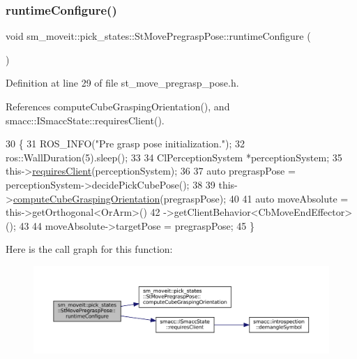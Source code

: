 \subsubsection{\texorpdfstring{runtime\+Configure()}{runtimeConfigure()}}
{\footnotesize\ttfamily void sm\+\_\+moveit\+::pick\+\_\+states\+::\+St\+Move\+Pregrasp\+Pose\+::runtime\+Configure (\begin{DoxyParamCaption}{ }\end{DoxyParamCaption})\hspace{0.3cm}{\ttfamily [inline]}}



Definition at line 29 of file st\+\_\+move\+\_\+pregrasp\+\_\+pose.\+h.



References compute\+Cube\+Grasping\+Orientation(), and smacc\+::\+I\+Smacc\+State\+::requires\+Client().


\begin{DoxyCode}
30     \{
31         ROS\_INFO(\textcolor{stringliteral}{"Pre grasp pose initialization."});
32         ros::WallDuration(5).sleep();
33 
34         ClPerceptionSystem *perceptionSystem;
35         this->\hyperlink{classsmacc_1_1ISmaccState_a7f95c9f0a6ea2d6f18d1aec0519de4ac}{requiresClient}(perceptionSystem);
36         
37         \textcolor{keyword}{auto} pregraspPose = perceptionSystem->decidePickCubePose();
38 
39         this->\hyperlink{structsm__moveit_1_1pick__states_1_1StMovePregraspPose_afe2fcedf9034c3c2999e81fb289cf459}{computeCubeGraspingOrientation}(pregraspPose);
40 
41         \textcolor{keyword}{auto} moveAbsolute = this->getOrthogonal<OrArm>()
42                                 ->getClientBehavior<CbMoveEndEffector>();
43 
44         moveAbsolute->targetPose = pregraspPose;
45     \}
\end{DoxyCode}
Here is the call graph for this function\+:
\nopagebreak
\begin{figure}[H]
\begin{center}
\leavevmode
\includegraphics[width=350pt]{structsm__moveit_1_1pick__states_1_1StMovePregraspPose_a2cb64008501b9572198a6767ec1f1fb0_cgraph}
\end{center}
\end{figure}
\mbox{\label{structsm__moveit_1_1pick__states_1_1StMovePregraspPose_a06a3b0a3c8bd47cf6a6c77e54421d592}} 
